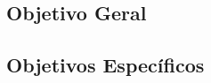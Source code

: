 \subsection{Objetivo Geral}\label{subsec:objetivo-geral}


\subsection{Objetivos Específicos}\label{subsec:objetivos-especificos}
